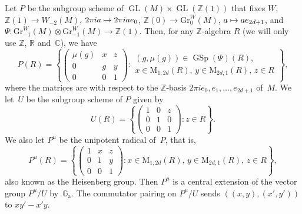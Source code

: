 \documentclass[JEP,XML,SOM,Unicode,NoFloatCountersInSection]{cedram}
\def\mto{\mathchoice{\longmapsto}{\mapsto}{\mapsto}{\mapsto}}
\theoremstyle{plain}
\theoremstyle{definition}
\numberwithin{equation}{subsection}
\renewcommand{\C}{\mathbb C}
\newcommand{\R}{\mathbb R}
\newcommand{\Z}{\mathbb Z}
\renewcommand{\G}{\mathbb G}
\newcommand{\Ga}{\G_{\mathrm{a}}}
\newcommand{\Gr}{\mathrm{Gr}}
\newcommand{\rmM}{\mathrm{M}}
\DeclareMathOperator{\GL}{GL}
\DeclareMathOperator{\GSp}{GSp}
\begin{document}
Let $P$ be the subgroup scheme of $\GL(M)\times\GL(\Z(1))$ that fixes
$W$, $\Z(1)\!\to\! W_{-2}(M)$, $2\pi i a\mto 2\pi i ae_0$,
$\Z(0)\to\Gr^W_0(M)$, $a\mto ae_{2d+1}$, and $\Psi\colon
\Gr^W_{-1}(M)\otimes \Gr^W_{-1}(M)\to\Z(1)$. Then, for any
$\Z$-algebra $R$ (we will only use $\Z$, $\R$ and~$\C$), we have
\begin{equation}
\label{eq:def_P}
P(R) =
\left\{
\begin{pmatrix}
\mu(g) & x & z\\
0 & g & y\\
0 & 0 & 1
\end{pmatrix} :
\begin{array}{c}
\text{$(g,\mu(g))\in\GSp(\Psi)(R)$,}\\[5pt]
\text{$x\in\rmM_{1,2d}(R)$, $y\in\rmM_{2d,1}(R)$, $z\in R$}
\end{array}
\right\},
\end{equation}
where the matrices are with respect to the $\Z$-basis $2\pi ie_0,
e_1,\ldots,e_{2d+1}$ of~$M$. We let~$U$ be the subgroup scheme of $P$
given by
\[
U(R) =
\left\{
\begin{pmatrix}
1 & 0 & z\\
0 & 1 & 0\\
0 & 0 & 1
\end{pmatrix} :
\text{$z\in R$}
\right\}.
\]
We also let $P^u$ be the
unipotent radical of~$P$, that is,
\[
P^u(R) =
\left\{
\begin{pmatrix}
1 & x & z\\
0 & 1 & y\\
0 & 0 & 1
\end{pmatrix} :
\text{$x\in\rmM_{1,2d}(R)$, $y\in\rmM_{2d,1}(R)$, $z\in R$}
\right\},
\]
also known as the Heisenberg group.
Then $P^u$ is a central extension of the vector group $P^u/U$
by~$\Ga$. The commutator pairing on $P^u/U$ sends
$((x,y),(x',y'))$ to $xy'-x'y$.
\end{document}

